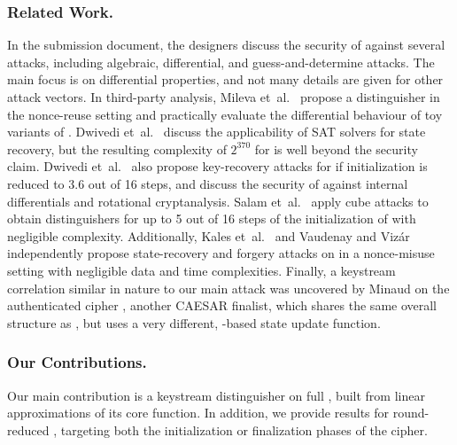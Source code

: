 \subsubsection*{Related Work.}
In the \MORUS submission document, the designers discuss the security of \MORUS against
several attacks, including algebraic, differential, and guess-and-determine attacks.
The main focus is on differential properties, and not many details are given for other attack vectors.
In third-party analysis,
Mileva et~al.~\cite{balkancryptsecMilevaDV15} propose a distinguisher in the nonce-reuse setting and practically evaluate the differential behaviour of toy variants of \MORUS.
Dwivedi et~al.~\cite{cryptoeprint:2016:1053} discuss the applicability of SAT solvers for state recovery, but the resulting complexity of $2^{370}$ for \MORUS[640] is well beyond the security claim.
Dwivedi et~al.~\cite{secryptDwivediMW17} also propose key-recovery attacks for \MORUS[1280] if initialization is reduced to 3.6 out of 16 steps, and discuss the security of \MORUS against internal differentials and rotational cryptanalysis.
Salam et~al.~\cite{trustcomSalamSBDPW17} apply cube attacks to obtain distinguishers for up to 5 out of 16 steps of the initialization of \MORUS[1280] with negligible complexity.
Additionally, 
Kales et~al.~\cite{cryptoeprint:2017:1137} and
Vaudenay and Viz\'{a}r \cite{cryptoeprint:2017:1147}
independently propose state-recovery and forgery attacks on \MORUS in a nonce-misuse setting with negligible data and time complexities.
Finally, a keystream correlation similar in nature to our main attack was uncovered by Minaud \cite{sacryptMinaud14} on the authenticated cipher  \cite{AEGIS,sacryptWuP13}, another CAESAR finalist, which shares the same overall structure as \MORUS, but uses a very different, -based state update function.

\subsubsection*{Our Contributions.}
Our main contribution is a keystream distinguisher on full \MORUS[1280], built from linear approximations of its core \StateUpdate{} function.
In addition, we provide results for round-reduced \MORUS, targeting both the initialization or finalization phases of the cipher.

